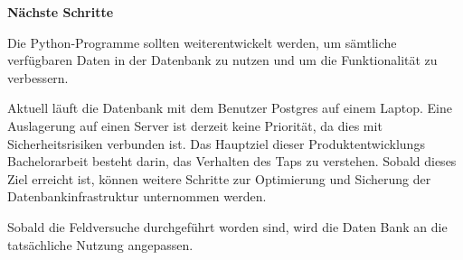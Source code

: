 \textbf{Nächste Schritte}

Die Python-Programme sollten weiterentwickelt werden, um sämtliche verfügbaren Daten in der Datenbank zu nutzen und um die Funktionalität zu verbessern.

Aktuell läuft die Datenbank mit dem Benutzer Postgres auf einem Laptop. Eine Auslagerung auf einen Server ist derzeit keine Priorität, da dies mit Sicherheitsrisiken verbunden ist. Das Hauptziel dieser Produktentwicklungs Bachelorarbeit besteht darin, das Verhalten des Taps zu verstehen. Sobald dieses Ziel erreicht ist, können weitere Schritte zur Optimierung und Sicherung der Datenbankinfrastruktur unternommen werden.

Sobald die Feldversuche durchgeführt worden sind, wird die Daten Bank an die tatsächliche Nutzung angepassen.

